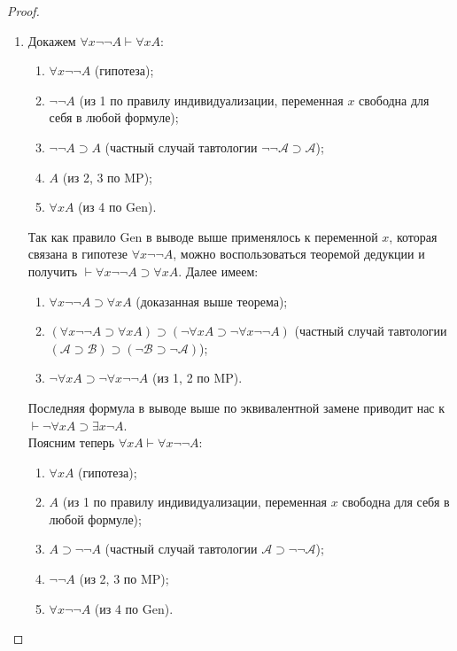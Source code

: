 \begin{proof}
\begin{enumerate}[label=\arabic*)]
        \item Докажем $\forall x\neg\neg A \vdash \forall xA$:
        \begin{enumerate}[label=\arabic*.]
            \item $\forall x\neg\neg A$ (гипотеза);
            \item $\neg\neg A$ (из 1 по правилу индивидуализации, переменная $x$ свободна для себя в любой формуле);
            \item $\neg\neg A \supset A$ (частный случай тавтологии $\neg\neg\mathcal{A} \supset \mathcal{A}$);
            \item $A$ (из 2, 3 по MP);
            \item $\forall xA$ (из 4 по Gen).
        \end{enumerate}
        Так как правило Gen в выводе выше применялось к переменной $x$, которая связана в гипотезе $\forall x\neg\neg A$, можно воспользоваться теоремой дедукции и получить $\vdash \forall x\neg\neg A \supset \forall xA$. Далее имеем:
        \begin{enumerate}[label=\arabic*.]
            \item $\forall x\neg\neg A \supset \forall xA$ (доказанная выше теорема);
            \item $(\forall x\neg\neg A \supset \forall xA) \supset (\neg \forall xA \supset \neg \forall x\neg\neg A)$ (частный случай тавтологии $(\mathcal{A} \supset \mathcal{B}) \supset (\neg\mathcal{B} \supset \neg\mathcal{A})$);
            \item $\neg \forall xA \supset \neg \forall x\neg\neg A$ (из 1, 2 по MP).
        \end{enumerate}
        Последняя формула в выводе выше по эквивалентной замене приводит нас к $\vdash \neg \forall xA \supset \exists x\neg A$. \\
        Поясним теперь $\forall xA \vdash \forall x\neg\neg A$:
        \begin{enumerate}[label=\arabic*.]
            \item $\forall xA$ (гипотеза);
            \item $A$ (из 1 по правилу индивидуализации, переменная $x$ свободна для себя в любой формуле);
            \item $A \supset \neg\neg A$ (частный случай тавтологии $\mathcal{A} \supset \neg\neg\mathcal{A}$);
            \item $\neg\neg A$ (из 2, 3 по MP);
            \item $\forall x\neg\neg A$ (из 4 по Gen).

\end{enumerate}
\end{enumerate}
\end{proof}

